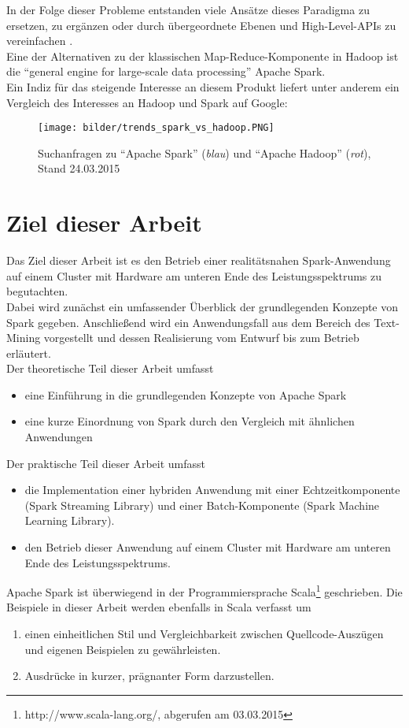 In der Folge dieser Probleme entstanden viele Ansätze dieses Paradigma zu ersetzen, zu ergänzen oder durch übergeordnete Ebenen und High-Level-APIs zu vereinfachen \cite{Sin14}.\\

Eine der Alternativen zu der klassischen Map-Reduce-Komponente in Hadoop ist die "`general engine for large-scale data processing"' Apache Spark.\\

Ein Indiz für das steigende Interesse an diesem Produkt liefert unter anderem ein Vergleich des Interesses an Hadoop und Spark auf Google:\\

\begin{figure}[h]
\texttt{[image: bilder/trends\_spark\_vs\_hadoop.PNG]}
\caption[Google Trends]{Suchanfragen zu "`Apache Spark"' (\textit{blau}) und "`Apache Hadoop"' (\textit{rot}), Stand 24.03.2015 \cite{googletrends}}
\end{figure}

\section{Ziel dieser Arbeit}
Das Ziel dieser Arbeit ist es den Betrieb einer realitätsnahen Spark-Anwendung auf einem Cluster mit Hardware am unteren Ende des Leistungsspektrums zu begutachten.\\
Dabei wird zunächst ein umfassender Überblick der grundlegenden Konzepte von Spark gegeben. Anschließend wird ein Anwendungsfall aus dem Bereich des Text-Mining vorgestellt und dessen Realisierung vom Entwurf bis zum Betrieb erläutert.\\

Der theoretische Teil dieser Arbeit umfasst
\begin{itemize}
  \item eine Einführung in die grundlegenden Konzepte von Apache Spark 
	\item eine kurze Einordnung von Spark durch den Vergleich mit ähnlichen Anwendungen
\end{itemize}

Der praktische Teil dieser Arbeit umfasst
\begin{itemize}
\item die Implementation einer hybriden Anwendung mit einer Echtzeitkomponente (Spark Streaming Library) und einer Batch-Komponente (Spark Machine Learning Library).
\item den Betrieb dieser Anwendung auf einem Cluster mit Hardware am unteren Ende des Leistungsspektrums.
\end{itemize}

Apache Spark ist überwiegend in der Programmiersprache Scala\footnote{http://www.scala-lang.org/, abgerufen am 03.03.2015} geschrieben. Die Beispiele in dieser Arbeit werden ebenfalls in Scala verfasst um
\begin{enumerate}
	\item einen einheitlichen Stil und Vergleichbarkeit zwischen Quellcode-Auszügen und eigenen Beispielen zu gewährleisten.
	\item Ausdrücke in kurzer, prägnanter Form darzustellen.
\end{enumerate}
